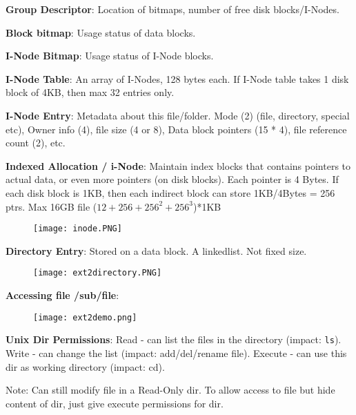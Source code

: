 \documentclass[a4paper,landscape]{article}
\newcommand{\rnname}[1]{\textbf{#1}}
\begin{document}
\begin{multicols*}{4}
\begin{flatitemize}
\item \rnname{Group Descriptor}: Location of bitmaps, number of free disk blocks/I-Nodes.
\item \rnname{Block bitmap}: Usage status of data blocks.
\item \rnname{I-Node Bitmap}: Usage status of I-Node blocks.
\item \rnname{I-Node Table}: An array of I-Nodes, 128 bytes each. If I-Node table takes 1 disk block of 4KB, then max 32 entries only.
\item \rnname{I-Node Entry}: Metadata about this file/folder. Mode (2) (file, directory, special etc), Owner info (4), file size (4 or 8), Data block pointers (15 * 4), file reference count (2), etc.
\item \rnname{Indexed Allocation / i-Node}: Maintain index blocks that contains pointers to actual data, or even more pointers (on disk blocks).  Each pointer is 4 Bytes. If each disk block is 1KB, then each indirect block can store 1KB/4Bytes = 256 ptrs. Max 16GB file ($12 + 256 + 256^2 + 256^3$)*1KB
\vspace{-1.5em}
\begin{figure}[H]
  \texttt{[image: inode.PNG]}
\end{figure}
\vspace{-1.5em}
\item \rnname{Directory Entry}: Stored on a data block. A linkedlist. Not fixed size.
\vspace{-1.5em}
\begin{figure}[H]
  \texttt{[image: ext2directory.PNG]}
\end{figure}
\vspace{-1.5em}
\item \rnname{Accessing file /sub/file}:
\vspace{-1.5em}
\begin{figure}[H]
  \texttt{[image: ext2demo.png]}
\end{figure}
\vspace{-1.5em}
\item \rnname{Unix Dir Permissions}: Read - can list the files in the directory (impact: \texttt{ls}). Write - can change the list (impact: add/del/rename file). Execute - can use this dir as working directory (impact: cd).
\item Note: Can still modify file in a Read-Only dir. To allow access to file but hide content of dir, just give execute permissions for dir. 
\end{flatitemize}
\end{multicols*}
\end{document}
